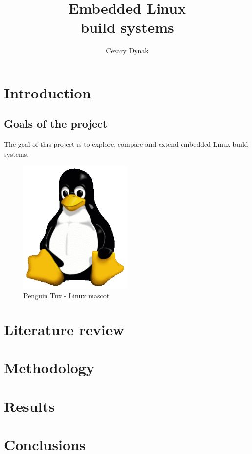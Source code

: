 \documentclass[printmode]{mgr}
\title{Embedded Linux \\ build systems}
\author{Cezary Dynak}
\begin{document}


\maketitle

\tableofcontents

\chapter{Introduction}
\section{Goals of the project}
The goal of this project is to explore, compare and extend embedded Linux
build systems. \cite{web:bis-org-pl}
\begin{figure}[htbp]
  \centering
    \includegraphics[width=0.5\textwidth]{Tux.png}
  \caption{Penguin Tux - Linux mascot}
  \label{fig:panel-dotykowy}
\end{figure}

\chapter{Literature review}
\label{chapter:literature-review}

\chapter{Methodology}

\chapter{Results}

\chapter{Conclusions}



\listoffigures
\listoftables
\end{document}
